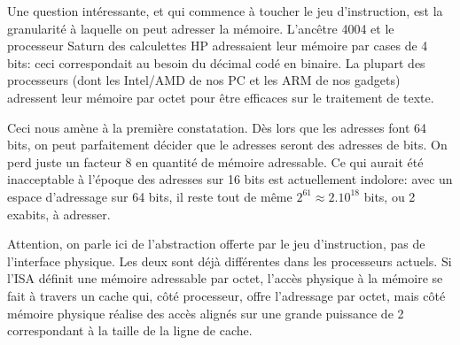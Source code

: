 \documentclass[architecture]{compas2018}
\begin{document}
\iffalse %
La croissance du bus de données a suivi avec du retard, pour plusieurs raisons.
La première est que la loi de Moore doit aussi fournir assez de transistors au processeur pour calculer sur des données de plus en plus grandes.
Mais la complexité des principales opérations d'un processeur travaillant sur $n$ bits est en $n$, en $n\log n$ ou au pire en $n^2$: si l'on a pu être à l'étroit jusque dans les années 90 pour construire un processeur qui peut calculer sur des adresses mémoires, ce n'est plus le cas depuis.
La seconde raison est que les ordinateurs servent beaucoup à travailler sur du texte, donc des octets.
On a donc vu des processeurs très populaires 8/16 bits, c'est à dire $w_d=8$ et  $w_a = 16$: les z80, 6502, 8088; des processeurs 16/32 bits (68000, 80286 à 486); et même une variante 8/32 bits, le 68008. Puis l'industrie a convergé vers 32/32 avec l'arrivée des processeurs RISC  (SPARC,  ARM et Power)  puis et 64/64 avec AMD64 et ARM64.
Ainsi,  
De nos jours, les processeurs ont des registres de plusieurs centaines de bits (AMD64 SSE* puis AVX*, ARM Neon), encore une fois parce que la loi de Moore le permet.
Mais ces registres sont des vecteurs de données d'au plus 64 bits.
\fi



Une question intéressante, et qui commence à toucher le jeu d'instruction, est  la granularité à laquelle on peut adresser la mémoire.
L'ancêtre 4004 et le processeur Saturn des calculettes HP adressaient leur mémoire par cases de 4 bits: ceci correspondait au besoin du décimal codé en binaire.
La plupart des processeurs (dont les Intel/AMD de nos PC et les ARM de nos gadgets) adressent leur mémoire par octet pour être efficaces sur le traitement de texte.

Ceci nous amène à la première constatation. Dès lors que les adresses font 64 bits, on peut parfaitement décider  que le adresses seront des adresses de bits.
On perd juste un facteur 8 en quantité de mémoire adressable.
Ce qui aurait été inacceptable à l'époque des adresses sur 16 bits est actuellement indolore: avec un espace d'adressage sur 64 bits, il reste tout de même $2^{61}\approx 2.10^{18}$ bits, ou 2 exabits, à adresser.


Attention, on parle ici de l'abstraction offerte par le jeu d'instruction, pas de l'interface physique.
Les deux sont déjà différentes dans les processeurs actuels.
Si l'ISA définit une mémoire adressable par octet, l'accès physique à la mémoire se fait à travers un cache qui, côté processeur, offre l'adressage par octet, mais côté mémoire physique  réalise des accès alignés sur une grande puissance de 2 correspondant à la taille de la ligne de cache.
\end{document}
